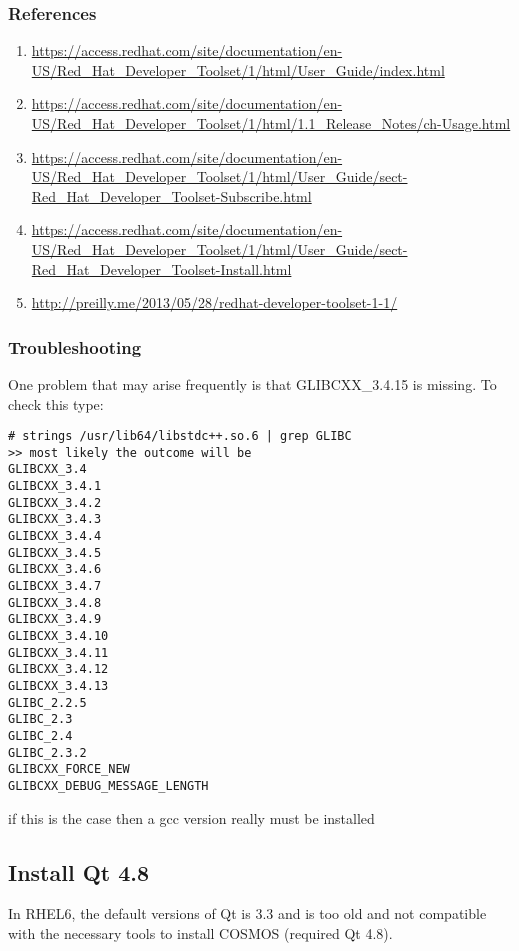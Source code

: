 \documentclass{article}
\begin{document}
\subsubsection{References}


\begin{enumerate}
\item \url{https://access.redhat.com/site/documentation/en-US/Red_Hat_Developer_Toolset/1/html/User_Guide/index.html}
\item
\url{https://access.redhat.com/site/documentation/en-US/Red_Hat_Developer_Toolset/1/html/1.1_Release_Notes/ch-Usage.html}
\item \url{https://access.redhat.com/site/documentation/en-US/Red_Hat_Developer_Toolset/1/html/User_Guide/sect-Red_Hat_Developer_Toolset-Subscribe.html}
\item \url{https://access.redhat.com/site/documentation/en-US/Red_Hat_Developer_Toolset/1/html/User_Guide/sect-Red_Hat_Developer_Toolset-Install.html}
\item \url{http://preilly.me/2013/05/28/redhat-developer-toolset-1-1/}
\end{enumerate}



\subsubsection{Troubleshooting}

One problem that may arise frequently is that GLIBCXX\_3.4.15 is missing. To check this type:
\begin{lstlisting}[style=BashInputStyle]
# strings /usr/lib64/libstdc++.so.6 | grep GLIBC
>> most likely the outcome will be
GLIBCXX_3.4
GLIBCXX_3.4.1
GLIBCXX_3.4.2
GLIBCXX_3.4.3
GLIBCXX_3.4.4
GLIBCXX_3.4.5	
GLIBCXX_3.4.6
GLIBCXX_3.4.7
GLIBCXX_3.4.8
GLIBCXX_3.4.9
GLIBCXX_3.4.10	
GLIBCXX_3.4.11
GLIBCXX_3.4.12
GLIBCXX_3.4.13
GLIBC_2.2.5
GLIBC_2.3
GLIBC_2.4
GLIBC_2.3.2
GLIBCXX_FORCE_NEW
GLIBCXX_DEBUG_MESSAGE_LENGTH
\end{lstlisting}

if this is the case then a gcc version really must be installed
















\subsection{Install Qt 4.8}
In RHEL6, the default versions of Qt is 3.3 and is too old and not compatible with the necessary tools to install COSMOS (required Qt 4.8).
\end{document}
